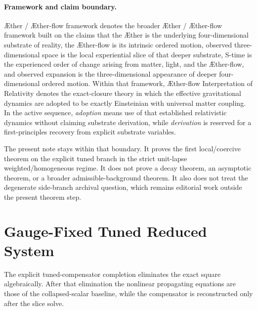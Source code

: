 \documentclass[11pt]{article}
\newcommand{\Aether}{\AE{}ther}
\newcommand{\Aflow}{\AE{}ther-flow}
\newcommand{\TheoryName}{\Aflow{} Interpretation of Relativity}
\newcommand{\TheoryProgram}{\Aether{} / \Aflow{} framework}
\begin{document}
\paragraph{Framework and claim boundary.}
\TheoryProgram{} denotes the broader \Aether{} / \Aflow{} framework built on the claims that the \Aether{} is the underlying four-dimensional substrate of reality, the \Aflow{} is its intrinsic ordered motion, observed three-dimensional space is the local experiential slice of that deeper substrate, S-time is the experienced order of change arising from matter, light, and the \Aflow{}, and observed expansion is the three-dimensional appearance of deeper four-dimensional ordered motion. Within that framework, \TheoryName{} denotes the exact-closure theory in which the effective gravitational dynamics are adopted to be exactly Einsteinian with universal matter coupling. In the active sequence, \emph{adoption} means use of that established relativistic dynamics without claiming substrate derivation, while \emph{derivation} is reserved for a first-principles recovery from explicit substrate variables.

The present note stays within that boundary. It proves the first local/coercive theorem on the explicit tuned branch in the strict unit-lapse weighted/homogeneous regime. It does not prove a decay theorem, an asymptotic theorem, or a broader admissible-background theorem. It also does not treat the degenerate side-branch archival question, which remains editorial work outside the present theorem step.

\section{Gauge-Fixed Tuned Reduced System}

The explicit tuned-compensator completion eliminates the exact square algebraically. After that elimination the nonlinear propagating equations are those of the collapsed-scalar baseline, while the compensator is reconstructed only after the slice solve.
\end{document}
